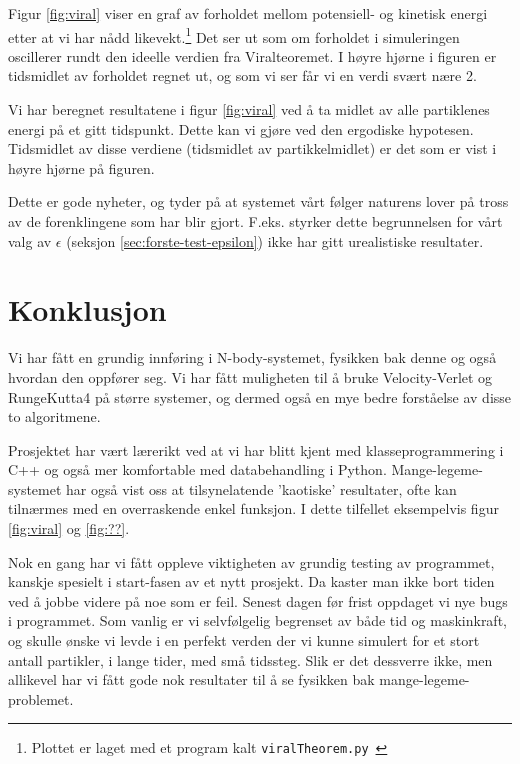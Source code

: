 \documentclass[11pt]{article}
\begin{document}
\begin{multicols*}{2}

Figur \ref{fig:viral} viser en graf av forholdet mellom potensiell- og
kinetisk energi etter at vi har nådd likevekt.\footnote{Plottet er
  laget med et program kalt
  \texttt{viralTheorem.py}~\cite{github-repo}} Det ser ut som om
forholdet i simuleringen oscillerer rundt den ideelle verdien fra
Viralteoremet. I høyre hjørne i figuren er tidsmidlet av forholdet
regnet ut, og som vi ser får vi en verdi svært nære 2. 

Vi har beregnet resultatene i figur \ref{fig:viral} ved å ta midlet av
alle partiklenes energi på et gitt tidspunkt. Dette kan vi gjøre ved
den ergodiske hypotesen. Tidsmidlet av disse
verdiene (tidsmidlet av partikkelmidlet) er det som er vist i høyre
hjørne på figuren.

Dette er gode nyheter, og tyder på at systemet vårt følger
naturens lover på tross av de forenklingene som har blir
gjort. F.eks. styrker dette begrunnelsen for vårt valg av $\epsilon$
(seksjon \ref{sec:forste-test-epsilon}) ikke har gitt urealistiske
resultater. 


\section{Konklusjon}
Vi har fått en grundig innføring i N-body-systemet, fysikken bak denne
og også hvordan den oppfører seg. Vi har fått muligheten til å
bruke Velocity-Verlet og RungeKutta4 på større systemer, og dermed
også en mye bedre forståelse av disse to algoritmene.

Prosjektet har vært lærerikt ved at vi har blitt kjent med
klasseprogrammering i C++ og også mer komfortable med databehandling
i Python. Mange-legeme-systemet har også vist oss at
tilsynelatende 'kaotiske' resultater, ofte kan tilnærmes
med en overraskende enkel funksjon. I dette tilfellet eksempelvis figur
\ref{fig:viral} og \ref{fig:??}.

Nok en gang har vi fått oppleve viktigheten av grundig testing
av programmet, kanskje spesielt i start-fasen av et nytt prosjekt. Da 
kaster man ikke bort tiden ved å jobbe videre på noe som er feil. Senest
dagen før frist oppdaget vi nye bugs i programmet. Som vanlig er vi
selvfølgelig begrenset av både tid og maskinkraft, og skulle ønske vi 
levde i en perfekt verden der vi kunne simulert for et stort antall partikler,
i lange tider, med små tidssteg. Slik er det dessverre ikke, 
men allikevel har vi fått gode nok resultater til å se fysikken bak mange-legeme-problemet.







\end{multicols*}
\clearpage
\printbibliography
\clearpage
\end{document}
